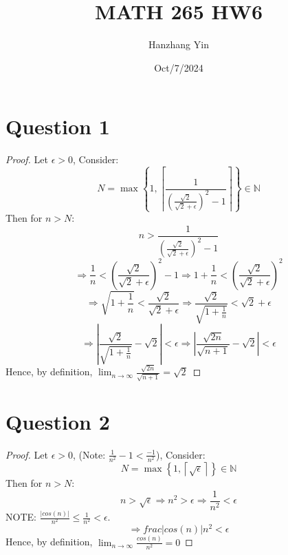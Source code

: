 \documentclass{article}
\title{MATH 265 HW6}
\author{Hanzhang Yin}
\date{Oct/7/2024}
\begin{document}
\maketitle

\section*{Question 1}
\begin{proof}
    Let $\epsilon > 0$, Consider:
    \[ N = \max\left\{1, \left\lceil \frac{1}{\left( \frac{\sqrt{2}}{\sqrt{2} + \epsilon} \right)^2 - 1 } \right\rceil \right\} \in \mathbb{N} \]
    Then for $n > N$:
    \[ n > \frac{1}{\left( \frac{\sqrt{2}}{\sqrt{2} + \epsilon} \right)^2 - 1} \]
    \[ \Rightarrow \frac{1}{n} < \left( \frac{\sqrt{2}}{\sqrt{2} + \epsilon} \right)^2 - 1 \Rightarrow 1 + \frac{1}{n} < \left( \frac{\sqrt{2}}{\sqrt{2} + \epsilon} \right)^2 \]
    \[ \Rightarrow \sqrt{1 + \frac{1}{n}} < \frac{\sqrt{2}}{\sqrt{2} + \epsilon} \Rightarrow \frac{\sqrt{2}}{\sqrt{1 + \frac{1}{n}}} < \sqrt{2} + \epsilon \]
    \[ \Rightarrow \left| \frac{\sqrt{2}}{\sqrt{1 + \frac{1}{n}}} - \sqrt{2} \right| < \epsilon \Rightarrow \left| \frac{\sqrt{2n}}{\sqrt{n + 1}} - \sqrt{2} \right| < \epsilon \]
    Hence, by definition, \( \lim_{n \to \infty} \frac{\sqrt{2n}}{\sqrt{n + 1}} = \sqrt{2} \)
\end{proof}

\section*{Question 2}
\begin{proof}
    Let $\epsilon > 0$, (Note: $\frac{1}{n^2} - 1 < \frac{-1}{n^2}$), Consider:
    \[ N = \max \left\{1, \left\lceil \sqrt{\epsilon} \right\rceil \right\} \in \mathbb{N} \]
    Then for $n > N$:
    \[ n > \sqrt{\epsilon} \Rightarrow n^2 > \epsilon \Rightarrow \frac{1}{n^2} < \epsilon \]
    NOTE: \( \frac{|cos(n)|}{n^2} \leq \frac{1}{n^2} < \epsilon \).
    \[ \Rightarrow frac{|cos(n)|}{n^2} < \epsilon \]
    Hence, by definition, \( \lim_{n \to \infty} \frac{cos(n)}{n^2} = 0 \)
\end{proof}
\end{document}
